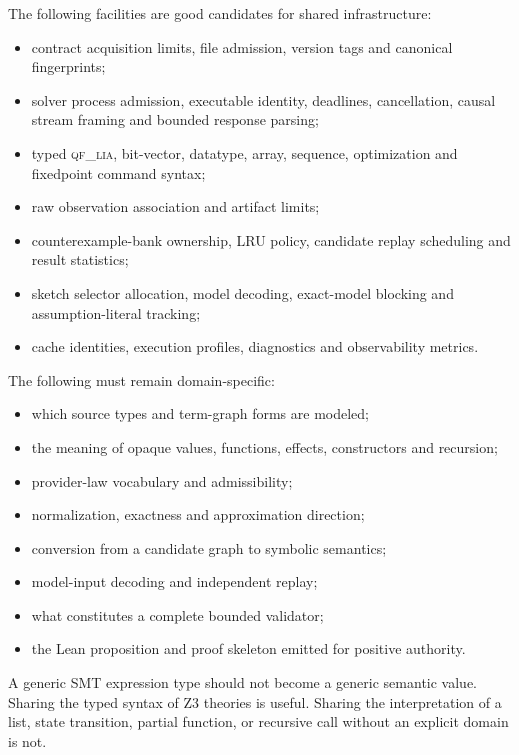 \documentclass[11pt,oneside]{report}
\newcommand{\QFLIA}{\textsc{qf\_lia}\xspace}
\begin{document}
The following facilities are good candidates for shared infrastructure:

\begin{itemize}[leftmargin=2em]
\item contract acquisition limits, file admission, version tags and canonical fingerprints;
\item solver process admission, executable identity, deadlines, cancellation, causal stream framing and bounded response parsing;
\item typed \QFLIA, bit-vector, datatype, array, sequence, optimization and fixedpoint command syntax;
\item raw observation association and artifact limits;
\item counterexample-bank ownership, LRU policy, candidate replay scheduling and result statistics;
\item sketch selector allocation, model decoding, exact-model blocking and assumption-literal tracking;
\item cache identities, execution profiles, diagnostics and observability metrics.
\end{itemize}

The following must remain domain-specific:

\begin{itemize}[leftmargin=2em]
\item which source types and term-graph forms are modeled;
\item the meaning of opaque values, functions, effects, constructors and recursion;
\item provider-law vocabulary and admissibility;
\item normalization, exactness and approximation direction;
\item conversion from a candidate graph to symbolic semantics;
\item model-input decoding and independent replay;
\item what constitutes a complete bounded validator;
\item the Lean proposition and proof skeleton emitted for positive authority.
\end{itemize}

\begin{caution}
A generic SMT expression type should not become a generic semantic value. Sharing the typed syntax of Z3 theories is useful. Sharing the interpretation of a list, state transition, partial function, or recursive call without an explicit domain is not.
\end{caution}
\end{document}
